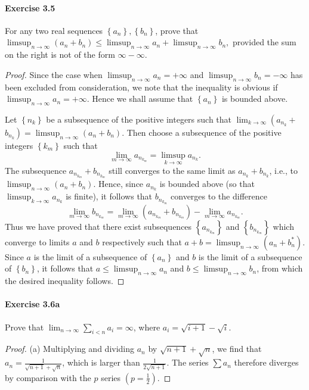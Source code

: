 \documentclass{article}
\theoremstyle{definition}
\begin{document}
\paragraph{Exercise 3.5} For any two real sequences $\left\{a_{n}\right\},\left\{b_{n}\right\}$, prove that $\limsup _{n \rightarrow \infty}\left(a_{n}+b_{n}\right) \leq \limsup _{n \rightarrow \infty} a_{n}+\limsup _{n \rightarrow \infty} b_{n},$ provided the sum on the right is not of the form $\infty-\infty$.
\begin{proof}
    Since the case when $\limsup _{n \rightarrow \infty} a_n=+\infty$ and $\limsup _{n \rightarrow \infty} b_n=-\infty$ has been excluded from consideration, we note that the inequality is obvious if $\limsup _{n \rightarrow \infty} a_n=+\infty$. Hence we shall assume that $\left\{a_n\right\}$ is bounded above.

Let $\left\{n_k\right\}$ be a subsequence of the positive integers such that $\lim _{k \rightarrow \infty}\left(a_{n_k}+\right.$ $\left.b_{n_k}\right)=\limsup _{n \rightarrow \infty}\left(a_n+b_n\right)$. Then choose a subsequence of the positive integers $\left\{k_m\right\}$ such that
$$
\lim _{m \rightarrow \infty} a_{n_{k_m}}=\limsup _{k \rightarrow \infty} a_{n_k} .
$$
The subsequence $a_{n_{k_m}}+b_{n_{k_m}}$ still converges to the same limit as $a_{n_k}+b_{n_k}$, i.e., to $\limsup _{n \rightarrow \infty}\left(a_n+b_n\right)$. Hence, since $a_{n_k}$ is bounded above (so that $\limsup _{k \rightarrow \infty} a_{n_k}$ is finite), it follows that $b_{n_{k_m}}$ converges to the difference
$$
\lim _{m \rightarrow \infty} b_{n_{k_m}}=\lim _{m \rightarrow \infty}\left(a_{n_{k_m}}+b_{n_{k_m}}\right)-\lim _{m \rightarrow \infty} a_{n_{k_m}} .
$$
Thus we have proved that there exist subsequences $\left\{a_{n_{k_m}}\right\}$ and $\left\{b_{n_{k_m}}\right\}$ which converge to limits $a$ and $b$ respectively such that $a+b=\limsup _{n \rightarrow \infty}\left(a_n+b_n^*\right)$. Since $a$ is the limit of a subsequence of $\left\{a_n\right\}$ and $b$ is the limit of a subsequence of $\left\{b_n\right\}$, it follows that $a \leq \limsup _{n \rightarrow \infty} a_n$ and $b \leq \limsup _{n \rightarrow \infty} b_n$, from which the desired inequality follows.
\end{proof}


\paragraph{Exercise 3.6a} Prove that $\lim_{n \rightarrow \infty} \sum_{i<n} a_i = \infty$, where $a_i = \sqrt{i + 1} -\sqrt{i}$.
\begin{proof}
    (a) Multiplying and dividing $a_n$ by $\sqrt{n+1}+\sqrt{n}$, we find that $a_n=\frac{1}{\sqrt{n+1}+\sqrt{n}}$, which is larger than $\frac{1}{2 \sqrt{n+1}}$. The series $\sum a_n$ therefore diverges by comparison with the $p$ series $\left(p=\frac{1}{2}\right)$.
\end{proof}
\end{document}
